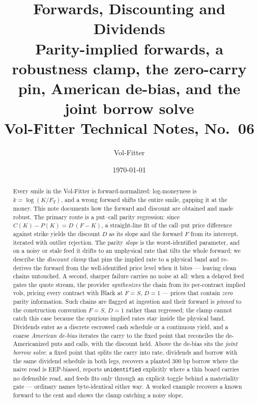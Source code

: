 \documentclass[11pt]{article}
\title{\textbf{Forwards, Discounting and Dividends}\\[2pt]
\large Parity-implied forwards, a robustness clamp, the zero-carry pin, American de-bias, and the joint borrow solve\\[2pt]
\normalsize Vol-Fitter Technical Notes, No.~06}
\author{Vol-Fitter}
\date{\today}
\begin{document}
\maketitle


\begin{abstract}
Every smile in the Vol-Fitter is forward-normalized: log-moneyness is
$k=\log(K/F_T)$, and a wrong forward shifts the entire smile, gapping it at the
money. This note documents how the forward and discount are obtained and made
robust. The primary route is a put--call parity regression: since
$C(K)-P(K)=D\,(F-K)$, a straight-line fit of the call--put price difference against
strike yields the discount $D$ as its slope and the forward $F$ from its intercept,
iterated with outlier rejection. The parity \emph{slope} is the worst-identified
parameter, and on a noisy or stale feed it drifts to an unphysical rate that tilts
the whole forward; we describe the \emph{discount clamp} that pins the implied rate
to a physical band and re-derives the forward from the well-identified price level
when it bites --- leaving clean chains untouched. A second, sharper failure carries
no noise at all: when a delayed feed gates the quote stream, the provider
\emph{synthesizes} the chain from its per-contract implied vols, pricing every
contract with Black at $F=S$, $D=1$ --- prices that contain \emph{zero} parity
information. Such chains are flagged at ingestion and their forward is
\emph{pinned} to the construction convention $F=S$, $D=1$ rather than regressed;
the clamp cannot catch this case because the spurious implied rates stay inside
the physical band. Dividends enter as a discrete
escrowed cash schedule or a continuous yield, and a coarse \emph{American de-bias}
iterates the carry to the fixed point that reconciles the de-Americanized puts and
calls, with the discount held. Above the de-bias sits the \emph{joint borrow
solve}: a fixed point that splits the carry into rate, dividends and borrow
with the same dividend schedule in both legs, recovers a planted $300$ bp
borrow where the naive read is EEP-biased, reports \texttt{unidentified}
explicitly where a thin board carries no defensible read, and feeds fits only
through an explicit toggle behind a materiality gate --- ordinary names
byte-identical either way. A worked example recovers a known forward to the
cent and shows the clamp catching a noisy slope.
\end{abstract}

\tableofcontents
\newpage

\end{document}
